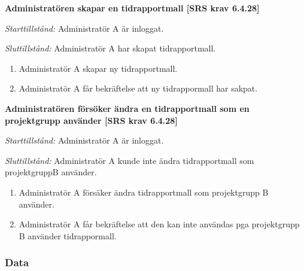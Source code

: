 \documentclass[a4paper]{article}
\begin{document}
\begin{FT}
\item %
\textbf{Administratören skapar en tidrapportmall [SRS krav 6.4.28]}

\emph{Starttillstånd:} Administratör A är inloggat.

\emph{Sluttillstånd:} Administratör A har skapat tidrapportmall.

\begin{enumerate}
\item Administratör A skapar ny tidrapportmall.
\item Administratör A får bekräftelse att ny tidrappormall har sakpat.
\end{enumerate}

\item %
\textbf{Administratören försöker ändra en tidrapportmall som en projektgrupp använder [SRS krav 6.4.28]}

\emph{Starttillstånd:} Administratör A är inloggat.

\emph{Sluttillstånd:} Administratör A kunde inte ändra  tidrapportmall som projektgruppB använder.

\begin{enumerate}
\item Administratör A försäker ändra tidrapportmall som projektgrupp B använder.
\item Administratör A får bekräftelse att  den kan inte användas pga projektgrupp B använder tidrappormall. 
\end{enumerate}

\end{FT}
\subsubsection{Data}
\end{document}

